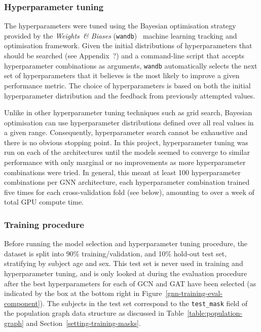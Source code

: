 \subsubsection{Hyperparameter tuning}
The hyperparameters were tuned using the Bayesian optimisation strategy provided by the \textit{Weights~\& Biases} (\texttt{wandb})~\cite{wandb} machine learning tracking and optimisation framework. Given the initial distributions of hyperparameters that should be searched (see Appendix~?) and a command-line script that accepts hyperparameter combinations as arguments, \texttt{wandb} automatically selects the next set of hyperparameters that it believes is the most likely to improve a given performance metric. The choice of hyperparameters is based on both the initial hyperparameter distribution and the feedback from previously attempted values.

Unlike in other hyperparameter tuning techniques such as grid search, Bayesian optimisation can use hyperparameter distributions defined over all real values in a given range. Consequently, hyperparameter search cannot be exhaustive and there is no obvious stopping point. In this project, hyperparameter tuning was run on each of the architectures until the models seemed to converge to similar performance with only marginal or no improvements as more hyperparameter combinations were tried. In general, this meant at least 100 hyperparameter combinations per GNN architecture, each hyperparameter combination trained five times for each cross-validation fold (see below), amounting to over a week of total GPU compute time.

\subsubsection{Training procedure}

Before running the model selection and hyperparameter tuning procedure, the dataset is split into 90\% training/validation, and 10\% hold-out test set, stratifying by subject age and sex. This test set is never used in training and hyperparameter tuning, and is only looked at during the evaluation procedure after the best hyperparameters for each of GCN and GAT have been selected (as indicated by the box at the bottom right in Figure~\ref{gnn-training-eval-component}). The subjects in the test set correspond to the \texttt{test\_mask} field of the population graph data structure as discussed in Table~\ref{table:population-graph} and Section~\ref{setting-training-masks}. 

